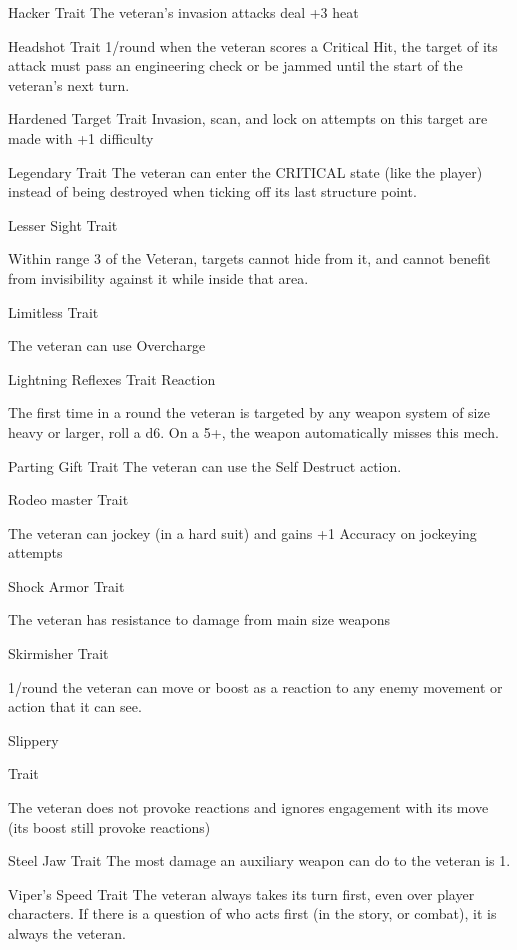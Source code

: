 Hacker  
Trait  
The veteran’s invasion attacks deal +3 heat
 

Headshot  
Trait  
1/round when the veteran scores a Critical Hit, the target of its attack must pass an engineering  
check or be jammed until the start of the veteran’s next turn.
 

Hardened Target  
Trait  
Invasion, scan, and lock on attempts on this target are made with +1 difficulty
 

Legendary  
Trait  
The veteran can enter the CRITICAL state (like the player) instead of being destroyed when  
ticking off its last structure point.
 

Lesser Sight  
Trait
 
Within range 3 of the Veteran, targets cannot hide from it, and cannot benefit from invisibility  
against it while inside that area.
 

Limitless  
Trait
 
The veteran can use Overcharge
 

Lightning Reflexes  
Trait  
Reaction
 
The first time in a round the veteran is targeted by any weapon system of size heavy or larger, roll  
a d6. On a 5+, the weapon automatically misses this mech.
 

Parting Gift  
Trait  
The veteran can use the Self Destruct action.
 

Rodeo master  
Trait  

                                                                                                                     


The veteran can jockey (in a hard suit) and gains +1 Accuracy on jockeying attempts
 

Shock Armor  
Trait
 
The veteran has resistance to damage from main size weapons
 

Skirmisher  
Trait
 
1/round the veteran can move or boost as a reaction to any enemy movement or action that it  
can see.
 

Slippery
 
Trait
 
The veteran does not provoke reactions and ignores engagement with its move (its boost still  
provoke reactions) 
 

Steel Jaw  
Trait  
The most damage an auxiliary weapon can do to the veteran is 1.
 

Viper’s Speed  
Trait  
The veteran always takes its turn first, even over player characters. If there is a question of who  
acts first (in the story, or combat), it is always the veteran.
 